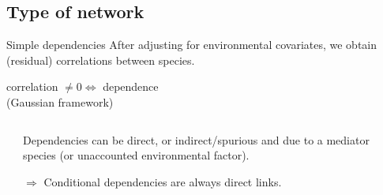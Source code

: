 \documentclass[11pt]{beamer}
\newcommand{\edgeunit}{1.5}
\newcommand{\emphase}[1]{\textcolor{Complement}{#1}}
\begin{document}
 \subsection{Type of network}
 \begin{frame}{Simple dependencies}
 After adjusting for environmental covariates, we obtain (residual) correlations between species.
 
 \begin{center}
 correlation $\neq 0 \iff$ dependence\\
 (Gaussian framework)\\
 \end{center}
 
\begin{columns}
\begin{column}{0.4\linewidth}
\end{column}
\begin{column}{0.5\linewidth}
 
 Dependencies can be  \emphase{direct}, or \emphase{indirect/spurious} and due to a mediator species (or unaccounted environmental factor).
 \bigskip\bigskip
 
$\Rightarrow$ Conditional dependencies are always direct links.
\end{column}
\end{columns}


 \end{frame}
\end{document}

